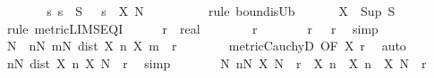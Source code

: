 \begin{isabellebody}
\ \ \ \ \isamarkupfalse%
\ \isamarkupfalse%
\ {\isachardoublequoteopen}{\isasymAnd}s{\isachardot}{\kern0pt}\ s\ {\isasymin}\ S\ {\isasymLongrightarrow}\ \ s\ {\isasymle}\ X\ N\ {\isacharplus}{\kern0pt}\ {}{\isachardoublequoteclose}\isanewline
\ \ \ \ \ \ \isamarkupfalse%
\ {\isacharparenleft}{\kern0pt}rule\ bound{\isacharunderscore}{\kern0pt}isUb{\isacharparenright}{\kern0pt}\isanewline
\ \ \isamarkupfalse%
\isanewline
\ \ \isamarkupfalse%
\ {\isachardoublequoteopen}X\ {\isasymlonglonglongrightarrow}\ Sup\ S{\isachardoublequoteclose}\isanewline
\ \ \isamarkupfalse%
\ {\isacharparenleft}{\kern0pt}rule\ metric{\isacharunderscore}{\kern0pt}LIMSEQ{\isacharunderscore}{\kern0pt}I{\isacharparenright}{\kern0pt}\isanewline
\ \ \ \ \isamarkupfalse%
\ r\ {\isacharcolon}{\kern0pt}{\isacharcolon}{\kern0pt}\ real\isanewline
\ \ \ \ \isamarkupfalse%
\ {\isachardoublequoteopen}{}\ {\isacharless}{\kern0pt}\ r{\isachardoublequoteclose}\isanewline
\ \ \ \ \isamarkupfalse%
\ \isamarkupfalse%
\ r{\isacharcolon}{\kern0pt}\ {\isachardoublequoteopen}{}\ {\isacharless}{\kern0pt}\ r{\isacharslash}{\kern0pt}{}{\isachardoublequoteclose}\ \isamarkupfalse%
\ simp\isanewline
\ \ \ \ \isamarkupfalse%
\ N\ \ {\isachardoublequoteopen}{\isasymforall}n{\isasymge}N{\isachardot}{\kern0pt}\ {\isasymforall}m{\isasymge}N{\isachardot}{\kern0pt}\ dist\ {\isacharparenleft}{\kern0pt}X\ n{\isacharparenright}{\kern0pt}\ {\isacharparenleft}{\kern0pt}X\ m{\isacharparenright}{\kern0pt}\ {\isacharless}{\kern0pt}\ r{\isacharslash}{\kern0pt}{}{\isachardoublequoteclose}\isanewline
\ \ \ \ \ \ \isamarkupfalse%
\ metric{\isacharunderscore}{\kern0pt}CauchyD\ {\isacharbrackleft}{\kern0pt}OF\ X\ r{\isacharbrackright}{\kern0pt}\ \isamarkupfalse%
\ auto\isanewline
\ \ \ \ \isamarkupfalse%
\ \isamarkupfalse%
\ {\isachardoublequoteopen}{\isasymforall}n{\isasymge}N{\isachardot}{\kern0pt}\ dist\ {\isacharparenleft}{\kern0pt}X\ n{\isacharparenright}{\kern0pt}\ {\isacharparenleft}{\kern0pt}X\ N{\isacharparenright}{\kern0pt}\ {\isacharless}{\kern0pt}\ r{\isacharslash}{\kern0pt}{}{\isachardoublequoteclose}\ \isamarkupfalse%
\ simp\isanewline
\ \ \ \ \isamarkupfalse%
\ \isamarkupfalse%
\ N{\isacharcolon}{\kern0pt}\ {\isachardoublequoteopen}{\isasymforall}n{\isasymge}N{\isachardot}{\kern0pt}\ X\ N\ {\isacharminus}{\kern0pt}\ r{\isacharslash}{\kern0pt}{}\ {\isacharless}{\kern0pt}\ X\ n\ {\isasymand}\ X\ n\ {\isacharless}{\kern0pt}\ X\ N\ {\isacharplus}{\kern0pt}\ r{\isacharslash}{\kern0pt}{}{\isachardoublequoteclose}\isanewline

\end{isabellebody}
